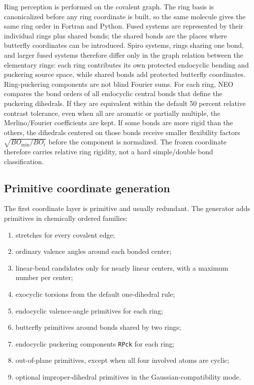 \documentclass[11pt]{article}
\begin{document}
Ring perception is performed on the covalent graph.  The ring basis is
canonicalized before any ring coordinate is built, so the same molecule gives
the same ring order in Fortran and Python.  Fused systems are represented by
their individual rings plus shared bonds; the shared bonds are the places where
butterfly coordinates can be introduced.  Spiro systems, rings sharing one
bond, and larger fused systems therefore differ only in the graph relation
between the elementary rings: each ring contributes its own protected
endocyclic bending and puckering source space, while shared bonds add protected
butterfly coordinates.  Ring-puckering components are not blind Fourier sums.
For each ring, NEO compares the bond orders of all endocyclic central bonds
that define the puckering dihedrals.  If they are equivalent within the default
50 percent relative contrast tolerance, even when all are aromatic or partially multiple, the Merlino/Fourier
coefficients are kept.  If some bonds are more rigid than the others, the
dihedrals centered on those bonds receive smaller flexibility factors
\(\sqrt{BO_\mathrm{min}/BO_i}\) before the component is normalized.  The frozen
coordinate therefore carries relative ring rigidity, not a hard simple/double
bond classification.

\subsection{Primitive coordinate generation}

The first coordinate layer is primitive and usually redundant.  The generator
adds primitives in chemically ordered families:

\begin{enumerate}
  \item stretches for every covalent edge;
  \item ordinary valence angles around each bonded center;
  \item linear-bend candidates only for nearly linear centers, with a maximum
        number per center;
  \item exocyclic torsions from the default one-dihedral rule;
  \item endocyclic valence-angle primitives for each ring;
  \item butterfly primitives around bonds shared by two rings;
  \item endocyclic puckering components \texttt{RPck} for each ring;
  \item out-of-plane primitives, except when all four involved atoms are cyclic;
  \item optional improper-dihedral primitives in the Gaussian-compatibility mode.
\end{enumerate}
\end{document}
